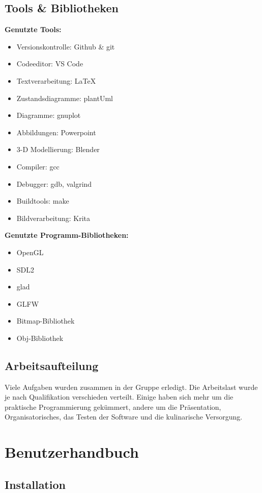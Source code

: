 \documentclass[11pt]{article}
\begin{document}
\subsection{Tools \& Bibliotheken}

\textbf{Genutzte Tools:}
\begin{itemize}
  \item Versionskontrolle: Github \& git
  \item Codeeditor: VS Code
  \item Textverarbeitung: \LaTeX
  \item Zustandsdiagramme: plantUml
  \item Diagramme: gnuplot
  \item Abbildungen: Powerpoint
  \item 3-D Modellierung: Blender
  \item Compiler: gcc
  \item Debugger: gdb, valgrind
  \item Buildtools: make
  \item Bildverarbeitung: Krita
\end{itemize}

\noindent \textbf{Genutzte Programm-Bibliotheken:}
\begin{itemize}
  \item OpenGL
  \item SDL2
  \item glad
  \item GLFW
  \item Bitmap-Bibliothek
  \item Obj-Bibliothek
\end{itemize}

\subsection{Arbeitsaufteilung}

Viele Aufgaben wurden zusammen in der Gruppe erledigt. 
Die Arbeitslast wurde je nach Qualifikation verschieden verteilt. 
Einige haben sich mehr um die praktische Programmierung gekümmert, andere um die Präsentation, Organisatorisches, das Testen der Software und die kulinarische Versorgung.

\pagebreak

\section{Benutzerhandbuch}

\subsection{Installation}
\end{document}
